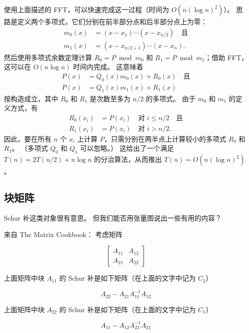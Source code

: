 使用上面描述的 FFT，可以快速完成这一过程（时间为 $O(n(\log n)^2)$）。
思路是定义两个多项式，它们分别在前半部分点和后半部分点上为零：
\begin{align*}
   m_0(x)&=(x-x_1)\cdots(x-x_{n/2}) \quad\text{且}\\
   m_1(x)&=(x-x_{n/2+1})\cdots(x-x_{n}).
\end{align*}
然后使用多项式余数定理计算 $R_0 = P \bmod m_0$ 和 $R_1 = P \bmod m_1$；借助 FFT，这可以在 $O(n\log n)$ 时间内完成。
这意味着
\begin{align*}
   P(x) &= Q_0(x)m_0(x) + R_0(x) \quad\text{且}\\
   P(x) &= Q_1(x)m_1(x) + R_1(x)
\end{align*}
按构造成立，其中 $R_0$ 和 $R_1$ 是次数至多为 $n/2$ 的多项式。
由于 $m_0$ 和 $m_1$ 的定义方式，有
\begin{align*}
R_0(x_i) &= P(x_i) \quad\text{对 } i \le n/2 \quad\text{且}\\
R_1(x_i) &= P(x_i) \quad\text{对 } i > n/2.
\end{align*}
因此，要在所有 $n$ 个 $x_i$ 上计算 $P$，只需分别在两半点上计算较小的多项式 $R_0$ 和 $R_1$。
（多项式 $Q_0$ 和 $Q_1$ 可以忽略。）
这给出了一个满足 $T(n) = 2T(n/2) + n\log n$ 的分治算法，从而推出 $T(n)=O(n(\log n)^2)$。



\subsection{块矩阵}
Schur 补这类对象很有意思。
但我们能否用张量图说出一些有用的内容？

来自 The Matrix Cookbook：
考虑矩阵

\[
   \left[ \begin{array}{c|c} A_{11} & A_{12} \\ \hline A_{21} & A_{22} \end{array} \right]
\]

上面矩阵中块 $A_{11}$ 的 Schur 补是如下矩阵（在上面的文字中记为 $C_2$）

\[
   A_{22} - A_{21}A_{11}^{-1}A_{12}
\]

上面矩阵中块 $A_{22}$ 的 Schur 补是如下矩阵（在上面的文字中记为 $C_1$）

\[
   A_{11} - A_{12}A_{22}^{-1}A_{21}
\]

